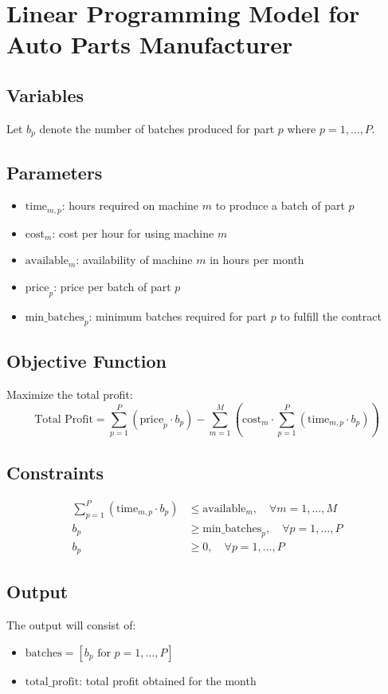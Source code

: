 \documentclass{article}
\begin{document}
\section*{Linear Programming Model for Auto Parts Manufacturer}

\subsection*{Variables}
Let \( b_p \) denote the number of batches produced for part \( p \) where \( p = 1, \ldots, P \).

\subsection*{Parameters}
\begin{itemize}
    \item \( \text{time}_{m,p} \): hours required on machine \( m \) to produce a batch of part \( p \)
    \item \( \text{cost}_{m} \): cost per hour for using machine \( m \)
    \item \( \text{available}_{m} \): availability of machine \( m \) in hours per month
    \item \( \text{price}_{p} \): price per batch of part \( p \)
    \item \( \text{min\_batches}_{p} \): minimum batches required for part \( p \) to fulfill the contract
\end{itemize}

\subsection*{Objective Function}
Maximize the total profit:
\[
\text{Total Profit} = \sum_{p=1}^{P} \left( \text{price}_{p} \cdot b_p \right) - \sum_{m=1}^{M} \left( \text{cost}_{m} \cdot \sum_{p=1}^{P} \left( \text{time}_{m,p} \cdot b_p \right) \right)
\]

\subsection*{Constraints}
\begin{align*}
\sum_{p=1}^{P} \left( \text{time}_{m,p} \cdot b_p \right) & \leq \text{available}_{m}, \quad \forall m = 1, \ldots, M \\
b_p & \geq \text{min\_batches}_{p}, \quad \forall p = 1, \ldots, P \\
b_p & \geq 0, \quad \forall p = 1, \ldots, P
\end{align*}

\subsection*{Output}
The output will consist of:
\begin{itemize}
    \item \( \text{batches} = [b_{p} \text{ for } p=1, \ldots, P] \)
    \item \( \text{total\_profit} \): total profit obtained for the month
\end{itemize}
\end{document}
